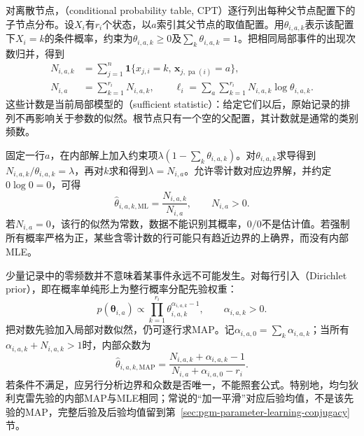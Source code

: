 对离散节点，（conditional probability table, CPT）逐行列出每种父节点配置下的子节点分布。设$X_i$有$r_i$个状态，以$a$索引其父节点的取值配置。用$\theta_{i,a,k}$表示该配置下$X_i=k$的条件概率，约束为$\theta_{i,a,k}\geq0$及$\sum_k\theta_{i,a,k}=1$。把相同局部事件的出现次数归并，得到
\begin{equation}
  \begin{aligned}
    N_{i,a,k}
      &=\sum_{j=1}^n
        \mathbf{1}\{x_{j,i}=k,\,
          \bm{x}_{j,\operatorname{pa}(i)}=a\},\\
    N_{i,a}&=\sum_{k=1}^{r_i}N_{i,a,k},\qquad
    \ell_i=\sum_a\sum_{k=1}^{r_i}
      N_{i,a,k}\log\theta_{i,a,k}.
  \end{aligned}
  \label{eq:pgm-parameter-learning-counts}
\end{equation}
这些计数是当前局部模型的（sufficient statistic）：给定它们以后，原始记录的排列不再影响关于参数的似然。根节点只有一个空的父配置，其计数就是通常的类别频数。

固定一行$a$，在内部解上加入约束项$\lambda(1-\sum_k\theta_{i,a,k})$。对$\theta_{i,a,k}$求导得到$N_{i,a,k}/\theta_{i,a,k}=\lambda$，再对$k$求和得到$\lambda=N_{i,a}$。允许零计数对应边界解，并约定$0\log0=0$，可得
\begin{equation}
  \widehat{\theta}_{i,a,k,\mathrm{ML}}
    =\frac{N_{i,a,k}}{N_{i,a}},\qquad N_{i,a}>0.
  \label{eq:pgm-parameter-learning-cpt-mle}
\end{equation}
若$N_{i,a}=0$，该行的似然为常数，数据不能识别其概率，$0/0$不是估计值。若强制所有概率严格为正，某些含零计数的行可能只有趋近边界的上确界，而没有内部MLE。

少量记录中的零频数并不意味着某事件永远不可能发生。对每行引入（Dirichlet prior），即在概率单纯形上为整行概率分配先验权重：
\[
  p(\bm{\theta}_{i,a})
  \propto\prod_{k=1}^{r_i}
    \theta_{i,a,k}^{\alpha_{i,a,k}-1},
  \qquad \alpha_{i,a,k}>0.
\]
把对数先验加入局部对数似然，仍可逐行求MAP。记$\alpha_{i,a,0}=\sum_k\alpha_{i,a,k}$；当所有$\alpha_{i,a,k}+N_{i,a,k}>1$时，内部众数为
\begin{equation}
  \widehat{\theta}_{i,a,k,\mathrm{MAP}}
    =\frac{N_{i,a,k}+\alpha_{i,a,k}-1}
            {N_{i,a}+\alpha_{i,a,0}-r_i}.
  \label{eq:pgm-parameter-learning-cpt-map}
\end{equation}
若条件不满足，应另行分析边界和众数是否唯一，不能照套公式。特别地，均匀狄利克雷先验的内部MAP与MLE相同；常说的“加一平滑”对应后验均值，不是该先验的MAP，完整后验及后验均值留到第~\ref{sec:pgm-parameter-learning-conjugacy}节。

